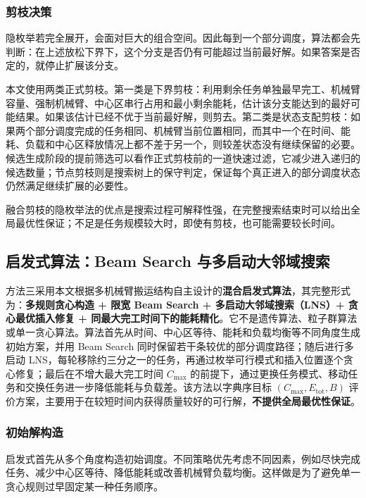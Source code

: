 \subsubsection{剪枝决策}

隐枚举若完全展开，会面对巨大的组合空间。因此每到一个部分调度，算法都会先判断：在上述放松下界下，这个分支是否仍有可能超过当前最好解。如果答案是否定的，就停止扩展该分支。

本文使用两类正式剪枝。第一类是下界剪枝：利用剩余任务单独最早完工、机械臂容量、强制机械臂、中心区串行占用和最小剩余能耗，估计该分支能达到的最好可能结果。如果该估计已经不优于当前最好解，则剪去。第二类是状态支配剪枝：如果两个部分调度完成的任务相同、机械臂当前位置相同，而其中一个在时间、能耗、负载和中心区释放情况上都不差于另一个，则较差状态没有继续保留的必要。候选生成阶段的提前筛选可以看作正式剪枝前的一道快速过滤，它减少进入递归的候选数量；节点剪枝则是搜索树上的保守判定，保证每个真正进入的部分调度状态仍然满足继续扩展的必要性。

融合剪枝的隐枚举法的优点是搜索过程可解释性强，在完整搜索结束时可以给出全局最优性保证；不足是任务规模较大时，即使有剪枝，也可能需要较长时间。

\subsection{启发式算法：Beam Search 与多启动大邻域搜索}

方法三采用本文根据多机械臂搬运结构自主设计的\textbf{混合启发式算法}，其完整形式为：\textbf{多规则贪心构造 + 限宽 Beam Search + 多启动大邻域搜索（LNS）+ 贪心最优插入修复 + 同最大完工时间下的能耗精化}。它不是遗传算法、粒子群算法或单一贪心算法。算法首先从时间、中心区等待、能耗和负载均衡等不同角度生成初始方案，并用 Beam Search 同时保留若干条较优的部分调度路径；随后进行多启动 LNS，每轮移除约三分之一的任务，再通过枚举可行模式和插入位置逐个贪心修复；最后在不增大最大完工时间 $C_{\max}$ 的前提下，通过更换任务模式、移动任务和交换任务进一步降低能耗与负载差。该方法以字典序目标 $(C_{\max},E_{\mathrm{tot}},B)$ 评价方案，主要用于在较短时间内获得质量较好的可行解，\textbf{不提供全局最优性保证}。

\subsubsection{初始解构造}

启发式首先从多个角度构造初始调度。不同策略优先考虑不同因素，例如尽快完成任务、减少中心区等待、降低能耗或改善机械臂负载均衡。这样做是为了避免单一贪心规则过早固定某一种任务顺序。

